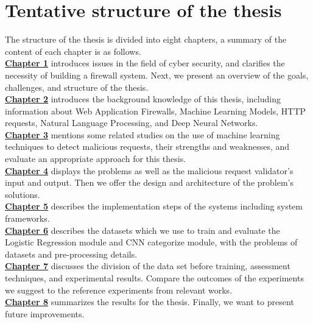 \section{Tentative structure of the thesis}
\label{sec:structure}
	\newcommand\nextintro{\\[4mm]}
	\hspace{0.5cm}The structure of the thesis is divided into eight chapters, a summary of the content of each chapter is as follows.
	\nextintro
	\hyperref[chap:introduction]{\textbf{Chapter 1}} introduces issues in the field of cyber security, and clarifies the necessity of building a firewall system. Next, we present an overview of the goals, challenges, and structure of the thesis.\nextintro
	\hyperref[chap:background]{\textbf{Chapter 2}} introduces the background knowledge of this thesis, including information about Web Application Firewalls, Machine Learning Models, HTTP requests, Natural Language Processing, and Deep Neural Networks.\nextintro
	\hyperref[chap:literaturereview]{\textbf{Chapter 3}} mentions some related studies on the use of machine learning techniques to detect malicious requests, their strengths and weaknesses, and evaluate an appropriate approach for this thesis.\nextintro
	\hyperref[chap:proposed_approaches]{\textbf{Chapter 4}} displays the problems as well as the malicious request validator's input and output. Then we offer the design and architecture of the problem's solutions.\nextintro
	\hyperref[chap:implementation]{\textbf{Chapter 5}} describes the implementation steps of the systems including system frameworks.\nextintro
	\hyperref[chap:dataset]{\textbf{Chapter 6}} describes the datasets which we use to train and evaluate the Logistic Regression module and CNN categorize module, with the problems of datasets and pre-processing details.\nextintro 
	\hyperref[chap:experiments]{\textbf{Chapter 7}} discusses the division of the data set before training, assessment techniques, and experimental results. Compare the outcomes of the experiments we suggest to the reference experiments from relevant works.\nextintro
	\hyperref[chap:conclusion]{\textbf{Chapter 8}} summarizes the results for the thesis. Finally, we want to present future improvements.